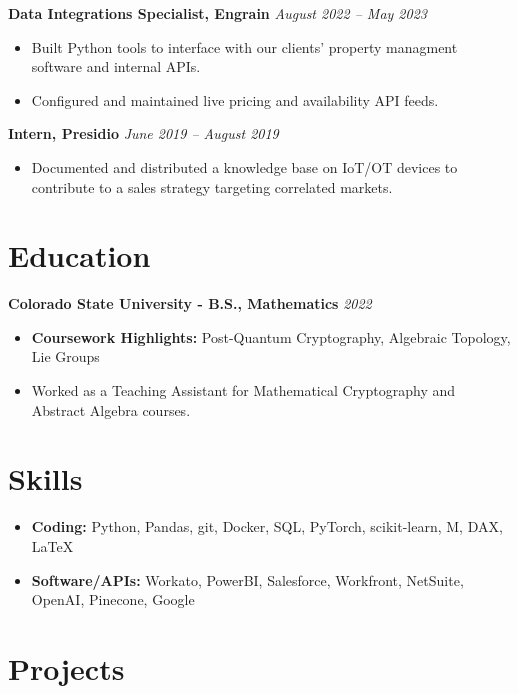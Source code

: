 \documentclass[a4paper,10pt]{article}
\newcommand{\resumeEntry}[2]{%
  \noindent\textbf{#1} \hfill \textit{#2}\par\vspace{-0.5ex}%
}
\begin{document}
\resumeEntry{Data Integrations Specialist, Engrain}{August 2022 -- May 2023}
\begin{itemize}[leftmargin=*, noitemsep]
    \item Built Python tools to interface with our clients' property managment software and internal APIs.
    \item Configured and maintained live pricing and availability API feeds.
\end{itemize}

\resumeEntry{Intern, Presidio}{June 2019 -- August 2019}
\begin{itemize}[leftmargin=*, noitemsep]
    \item Documented and distributed a knowledge base on IoT/OT devices to contribute to a sales strategy 
    targeting correlated markets.
\end{itemize}

\section*{Education}

\resumeEntry{Colorado State University - B.S., Mathematics}{2022}
\begin{itemize}[leftmargin=*, noitemsep]
    \item \textbf{Coursework Highlights:} Post-Quantum Cryptography, Algebraic Topology, Lie Groups
    \item Worked as a Teaching Assistant for Mathematical Cryptography and Abstract Algebra courses.
\end{itemize}

\section*{Skills}
\begin{itemize}[leftmargin=*, noitemsep]
    \item \textbf{Coding:} Python, Pandas, git, Docker, SQL, PyTorch, scikit-learn, M, DAX, LaTeX
    \item \textbf{Software/APIs:} Workato, PowerBI, Salesforce, Workfront, NetSuite, OpenAI, Pinecone, Google
\end{itemize}

\section*{Projects}
\end{document}
